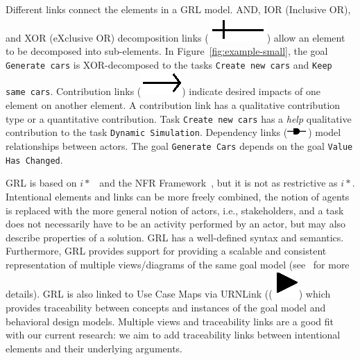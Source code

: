 Different links connect the elements in a GRL model. AND, IOR (Inclusive OR), and XOR (eXclusive OR) decomposition links (\includegraphics[scale=1]{img/decomposition}) allow an element to be decomposed into sub-elements. In Figure~\ref{fig:example-small}, the goal \texttt{Generate cars} is XOR-decomposed to the tasks \texttt{Create new cars} and \texttt{Keep same cars}. Contribution links (\includegraphics[scale=1]{img/contribution}) indicate desired impacts of one element on another element. A contribution link has a qualitative contribution type or a quantitative contribution. Task  \texttt{Create new cars} has a \emph{help} qualitative contribution to the task \texttt{Dynamic Simulation}. Dependency links (\includegraphics[scale=1]{img/dependency}) model relationships between actors. The goal \texttt{Generate Cars} depends on the goal \texttt{Value Has Changed}. %

GRL is based on $i*$~\cite{Yu:1997:TMR:827255.827807} and the NFR Framework~\cite{chung2012non}, but it is not as restrictive as $i*$. Intentional elements and links can be more freely combined, the notion of agents is replaced with the more general notion of actors, i.e., stakeholders, and a task does not necessarily have to be an activity performed by an actor, but may also describe properties of a solution. GRL has a well-defined syntax and semantics. Furthermore, GRL provides support for providing a scalable and consistent representation of multiple views/diagrams of the same goal model (see~\cite[Ch.2]{Ghanavati2013} for more details). GRL is also linked to Use Case Maps via URNLink ((\includegraphics[scale=1]{img/urnlink}) which provides traceability between concepts and instances of the goal model and behavioral design models. Multiple views and traceability links are a good fit with our current research: we aim to add traceability links between intentional elements and their underlying arguments. 

